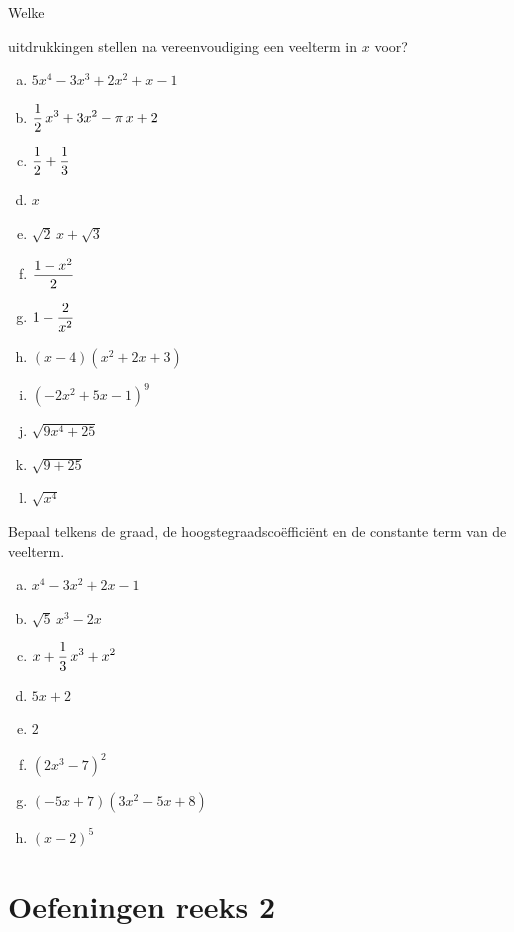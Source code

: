 \documentclass{ximera}
\begin{document}
\begin{Oefening}\setcounter{enumi}{3}
\hypertarget{oef1.3}{Welke} uitdrukkingen stellen na vereenvoudiging een veelterm in $x$ voor? 
\begin{multicols}{2}
\begin{enumerate}[(a)]
\item
$5x^4-3x^3+2x^2+x-1$
\item
$\displaystyle \frac{1}{2}\,x^3 + 3x^2-\pi\,x+2$
\item
$\displaystyle \frac{1}{2}+\frac{1}{3}$
\item
$x$
\item
$\sqrt{2}\,x + \sqrt{3}$
\item
$\displaystyle \frac{1-x^2}{2}$ 
\item
$\displaystyle 1-\frac{2}{x^2}$
\item
$(x-4)(x^2+2x+3)$
\item
$(-2x^2+5x-1)^{9}$
\item
$\sqrt{9x^4+25}$
\item
$\sqrt{9+25}$
\item
$\sqrt{x^4}$
\end{enumerate}
\end{multicols}
\end{Oefening}

\begin{Oefening} %
Bepaal telkens de graad, de hoogstegraadsco\"effici\"ent en de constante term van de veelterm.
\begin{multicols}{2}
\begin{enumerate}[(a)]
\item
$x^4-3x^2+2x-1$
\item
$\sqrt{5}\,x^3-2x$
\item
$\displaystyle x+\frac{1}{3}\,x^3+x^2$
\item
$5x+2$
\item
$2$
\item
$(2x^3-7)^2$
\item
$(-5x+7)(3x^2-5x+8)$
\item
$(x-2)^5$
\end{enumerate}
\end{multicols}
\end{Oefening}

\section*{Oefeningen reeks 2}
\end{document}
